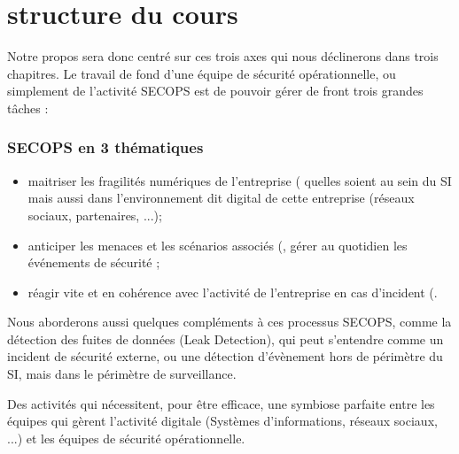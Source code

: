 \newpage
\section{structure du cours}

Notre propos sera donc centré sur ces trois axes  qui nous déclinerons dans trois chapitres. Le travail de fond d'une équipe de sécurité opérationnelle, ou simplement de l'activité SECOPS est de pouvoir gérer de front trois grandes tâches : 

\begin{frame}
\frametitle<presentation>{SECOPS en 3 thématiques}
\begin{itemize}
 \item maitriser les fragilités numériques de l'entreprise ( quelles soient au sein du SI mais aussi dans l'environnement dit digital de cette entreprise (réseaux sociaux, partenaires, ...);
 \item anticiper les menaces et les scénarios associés (, gérer au quotidien les événements de sécurité ;
 \item réagir vite et en cohérence avec l'activité de l'entreprise en cas d'incident (.
\end{itemize}
\end{frame}

Nous aborderons aussi quelques compléments à ces processus SECOPS, comme la détection des fuites de données (Leak Detection), qui peut s'entendre comme un incident de sécurité externe, ou une détection d'évènement hors de périmètre du SI, mais dans le périmètre de surveillance.


Des activités qui nécessitent, pour être efficace, une symbiose parfaite entre les équipes qui gèrent l'activité digitale (Systèmes d'informations, réseaux sociaux, ...) et les équipes de sécurité opérationnelle.





